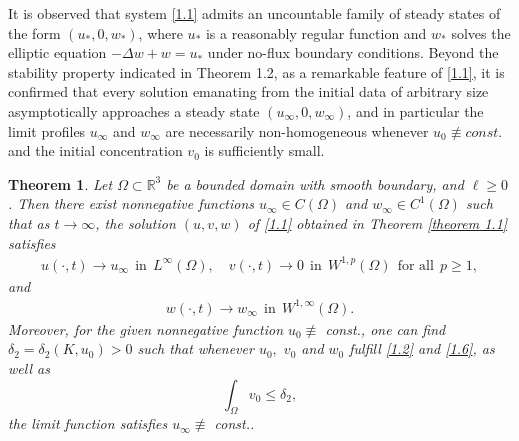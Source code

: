 \documentclass[12pt]{article}
\theoremstyle{plain}
\newtheorem{theorem}{Theorem}[section]
\theoremstyle{definition}
\numberwithin{equation}{section}
\begin{document}
It is observed that  system \eqref{1.1} admits an uncountable family of steady states of the form
 $(u_*,0,w_*)$, where $u_*$ is a reasonably regular
 function and $w_*$ solves the elliptic equation  $-\Delta w+w=u_* $
 under no-flux boundary conditions.
  Beyond the stability  property  indicated in Theorem 1.2, as a remarkable feature of \eqref{1.1}, it is confirmed that every solution emanating from  the initial data of arbitrary size asymptotically approaches a steady state  $(u_\infty,0,w_\infty)$, and in particular the limit profiles  $u_\infty$ and $w_\infty$ are necessarily non-homogeneous  whenever $u_0\not\equiv const.$ and the initial concentration $v_0$   is sufficiently small.

\begin{theorem}\label{Th1.3}
Let $\Omega \subset \mathbb R^3$ be a bounded domain with smooth boundary, and $\ell\geq0$.
 Then  there exist  nonnegative functions $u_{\infty}\in C(\Omega)$
 and $w_{\infty}\in C^1(\Omega)$ such that as $t\to \infty$, the solution $(u,v,w)$ of \eqref{1.1} obtained in Theorem \ref{theorem 1.1} satisfies
\begin{align}\label{1.10}
    u(\cdot,t)\rightarrow u_{\infty}~~\mbox{in}~~L^\infty(\Omega),\quad v(\cdot,t)\rightarrow 0~~\mbox{in}~~W^{1,p}(\Omega)~~ \mbox{for all}~~p\geq 1,
\end{align}
and
\begin{align}
w(\cdot,t)\rightarrow w_{\infty}~~ \mbox{in}~~W^{1,\infty}(\Omega).%
\end{align}
Moreover, for the given nonnegative function $u_0\not\equiv$ const., one can find
$\delta_2=\delta_2(K,u_0)>0$ such that whenever $u_0,$ $v_0$ and $w_0$ fulfill
\eqref{1.2} and \eqref{1.6}, as well as
$$\int_{\Omega}v_0\leq \delta_2,$$
the limit function satisfies
 $ u_{\infty}\not\equiv$ const..
\end{theorem}

\end{document}
